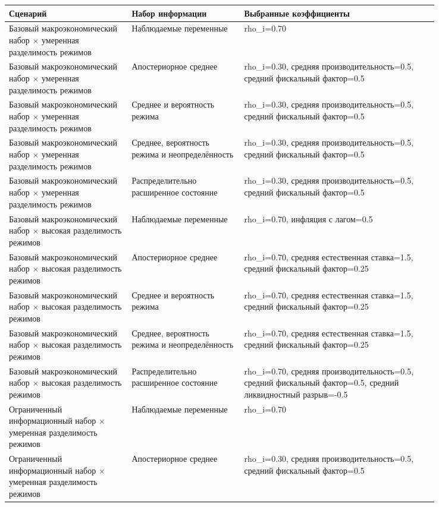 \begin{tabular}{p{0.24\linewidth}p{0.22\linewidth}p{0.38\linewidth}}
\toprule
Сценарий & Набор информации & Выбранные коэффициенты \\
\midrule
Базовый макроэкономический набор × умеренная разделимость режимов & Наблюдаемые переменные & rho\_i=0.70 \\
Базовый макроэкономический набор × умеренная разделимость режимов & Апостериорное среднее & rho\_i=0.30, средняя производительность=0.5, средний фискальный фактор=0.5 \\
Базовый макроэкономический набор × умеренная разделимость режимов & Среднее и вероятность режима & rho\_i=0.30, средняя производительность=0.5, средний фискальный фактор=0.5 \\
Базовый макроэкономический набор × умеренная разделимость режимов & Среднее, вероятность режима и неопределённость & rho\_i=0.30, средняя производительность=0.5, средний фискальный фактор=0.5 \\
Базовый макроэкономический набор × умеренная разделимость режимов & Распределительно расширенное состояние & rho\_i=0.30, средняя производительность=0.5, средний фискальный фактор=0.5 \\
Базовый макроэкономический набор × высокая разделимость режимов & Наблюдаемые переменные & rho\_i=0.70, инфляция с лагом=0.5 \\
Базовый макроэкономический набор × высокая разделимость режимов & Апостериорное среднее & rho\_i=0.70, средняя естественная ставка=1.5, средний фискальный фактор=0.25 \\
Базовый макроэкономический набор × высокая разделимость режимов & Среднее и вероятность режима & rho\_i=0.70, средняя естественная ставка=1.5, средний фискальный фактор=0.25 \\
Базовый макроэкономический набор × высокая разделимость режимов & Среднее, вероятность режима и неопределённость & rho\_i=0.70, средняя естественная ставка=1.5, средний фискальный фактор=0.25 \\
Базовый макроэкономический набор × высокая разделимость режимов & Распределительно расширенное состояние & rho\_i=0.70, средняя производительность=0.5, средний фискальный фактор=0.5, средний ликвидностный разрыв=-0.5 \\
Ограниченный информационный набор × умеренная разделимость режимов & Наблюдаемые переменные & rho\_i=0.70 \\
Ограниченный информационный набор × умеренная разделимость режимов & Апостериорное среднее & rho\_i=0.30, средняя производительность=0.5, средний фискальный фактор=0.5 \\

\end{tabular}
